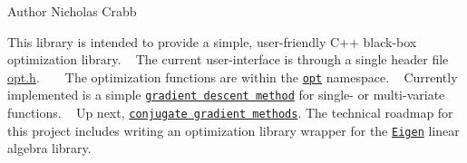 \begin{DoxyAuthor}{Author}
Nicholas Crabb
\end{DoxyAuthor}
This library is intended to provide a simple, user-\/friendly C++ black-\/box optimization library. ~\newline
 The current user-\/interface is through a single header file \mbox{\hyperlink{opt_8h_source}{opt.\+h}}. ~\newline
 ~\newline
 The optimization functions are within the \href{https://charelstoncrabb.github.io/basic_opt/html/namespaceopt.html}{\tt opt} namespace. ~\newline
 Currently implemented is a simple \href{https://en.wikipedia.org/wiki/Gradient_descent}{\tt gradient descent method} for single-\/ or multi-\/variate functions. ~\newline
 Up next, \href{https://en.wikipedia.org/wiki/Conjugate_gradient_method}{\tt conjugate gradient methods}. The technical roadmap for this project includes writing an optimization library wrapper for the \href{http://eigen.tuxfamily.org/index.php?title=Main_Page}{\tt Eigen} linear algebra library. 